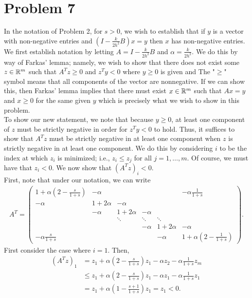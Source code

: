 \documentclass{article}
\begin{document}
\section{Problem 7}
In the notation of Problem 2, for $s > 0$, we wish to establish
that if $y$ is a vector with non-negative entries and $\left( I - \frac{k}{2h^2}B \right) x = y$ then $x$ has non-negative entries. We first establish notation by letting $A=I - \frac{k}{2h^2}B$ and $\alpha=\frac{k}{2h^2}$. We do this by way of Farkas' lemma; namely, we wish to show that there does not exist some $z\in\mathbb{R}^m$ such that $A^Tz\geq0$ and $z^Ty<0$ where $y\geq0$ is given and The "$\geq$" symbol means that all components of the vector are nonnegative. If we can show this, then Farkas' lemma implies that there must exist $x\in\mathbb{R}^m$ such that $Ax=y$ and $x\geq0$ for the same given $y$ which is precisely what we wish to show in this problem.\\
To show our new statement, we note that because $y\geq0$, at least one component of $z$ must be strictly negative in order for $z^Ty<0$ to hold. Thus, it suffices to show that $A^Tz$ must be strictly negative in at least one component when $z$ is strictly negative in at least one component. We do this by considering $i$ to be the index at which $z_i$ is minimized; i.e., $z_i\leq z_j$ for all $j=1,\ldots,m$. Of course, we must have that $z_i<0$. We now show that $(A^Tz)_i<0$. \\
First, note that under our notation, we can write
\begin{align*}
	A^T = \begin{pmatrix}
		1+\alpha\left(2 - \frac{s}{1 + s}\right) & -\alpha &&&& -\alpha\frac{1}{1 + s}\\
		-\alpha & 1+2\alpha & -\alpha \\
		& -\alpha & 1+2\alpha & -\alpha & \\
		&&\ddots & \ddots & \ddots \\
		&&&-\alpha & 1+2\alpha & -\alpha \\
		-\alpha\frac{s}{1+s} &&&& -\alpha & 1+\alpha\left(2 - \frac{1}{1+s}\right) \end{pmatrix}.
\end{align*}
First consider the case where $i=1$. Then,
\begin{align*}
(A^Tz)_1&=z_1+\alpha\left(2 - \frac{s}{1 + s}\right)z_1-\alpha z_2-\alpha\frac{1}{1 + s}z_m\\&\leq 
z_1+\alpha\left(2 - \frac{s}{1 + s}\right)z_1-\alpha z_1-\alpha\frac{1}{1 + s}z_1\\&=
z_1+\alpha\left(1-\frac{s+1}{1+s}\right)z_1=z_1<0.
\end{align*}
\end{document}
